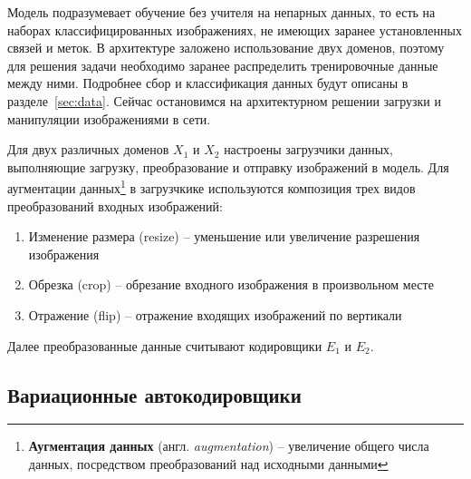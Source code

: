 \documentclass[11pt,a4paper]{extarticle}
\begin{document}
{		Модель подразумевает обучение без учителя на непарных данных, то есть на наборах классифицированных изображениях, не имеющих заранее установленных связей и меток.
		В архитектуре заложено использование двух доменов, поэтому для решения задачи необходимо заранее распределить тренировочные данные между ними.
		Подробнее сбор и классификация данных будут описаны в разделе~\ref{sec:data}. Сейчас остановимся на архитектурном решении загрузки и манипуляции изображениями в сети.

		Для двух различных доменов \(X_1\) и \(X_2\) настроены загрузчики данных, выполняющие загрузку, преобразование и отправку изображений в модель.
		Для аугментации данных\footnote{
			\textbf{Аугментация данных} (англ. \textit{augmentation}) -- увеличение общего числа данных, посредством преобразований над исходными данными 
		}
		в загрузчкике используются композиция трех видов преобразований входных изображений:

		\begin{enumerate}
			\item Изменение размера (resize) -- уменьшение или увеличение разрешения изображения
			\item Обрезка (crop) -- обрезание входного изображения в произвольном месте
			\item Отражение (flip) -- отражение входящих изображений по вертикали
		\end{enumerate}
		\noindent
		Далее преобразованные данные считывают кодировщики \(E_1\) и \(E_2\).

	\subsection{Вариационные автокодировщики}\label{sec:model:vae}

}
\end{document}
